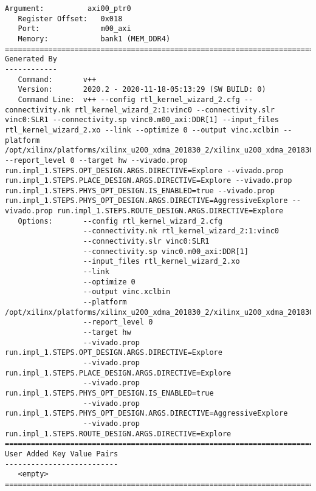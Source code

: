 \begin{center}
\begin{lstlisting}[label=lst:xclbin_info,caption=Файл vinc.xclbin.info]
   Argument:          axi00_ptr0
   Register Offset:   0x018
   Port:              m00_axi
   Memory:            bank1 (MEM_DDR4)
==============================================================================
Generated By
------------
   Command:       v++
   Version:       2020.2 - 2020-11-18-05:13:29 (SW BUILD: 0)
   Command Line:  v++ --config rtl_kernel_wizard_2.cfg --connectivity.nk rtl_kernel_wizard_2:1:vinc0 --connectivity.slr vinc0:SLR1 --connectivity.sp vinc0.m00_axi:DDR[1] --input_files rtl_kernel_wizard_2.xo --link --optimize 0 --output vinc.xclbin --platform /opt/xilinx/platforms/xilinx_u200_xdma_201830_2/xilinx_u200_xdma_201830_2.xpfm --report_level 0 --target hw --vivado.prop run.impl_1.STEPS.OPT_DESIGN.ARGS.DIRECTIVE=Explore --vivado.prop run.impl_1.STEPS.PLACE_DESIGN.ARGS.DIRECTIVE=Explore --vivado.prop run.impl_1.STEPS.PHYS_OPT_DESIGN.IS_ENABLED=true --vivado.prop run.impl_1.STEPS.PHYS_OPT_DESIGN.ARGS.DIRECTIVE=AggressiveExplore --vivado.prop run.impl_1.STEPS.ROUTE_DESIGN.ARGS.DIRECTIVE=Explore 
   Options:       --config rtl_kernel_wizard_2.cfg
                  --connectivity.nk rtl_kernel_wizard_2:1:vinc0
                  --connectivity.slr vinc0:SLR1
                  --connectivity.sp vinc0.m00_axi:DDR[1]
                  --input_files rtl_kernel_wizard_2.xo
                  --link
                  --optimize 0
                  --output vinc.xclbin
                  --platform /opt/xilinx/platforms/xilinx_u200_xdma_201830_2/xilinx_u200_xdma_201830_2.xpfm
                  --report_level 0
                  --target hw
                  --vivado.prop run.impl_1.STEPS.OPT_DESIGN.ARGS.DIRECTIVE=Explore
                  --vivado.prop run.impl_1.STEPS.PLACE_DESIGN.ARGS.DIRECTIVE=Explore
                  --vivado.prop run.impl_1.STEPS.PHYS_OPT_DESIGN.IS_ENABLED=true
                  --vivado.prop run.impl_1.STEPS.PHYS_OPT_DESIGN.ARGS.DIRECTIVE=AggressiveExplore
                  --vivado.prop run.impl_1.STEPS.ROUTE_DESIGN.ARGS.DIRECTIVE=Explore 
==============================================================================
User Added Key Value Pairs
--------------------------
   <empty>
==============================================================================

\end{lstlisting}
\end{center}

\clearpage

